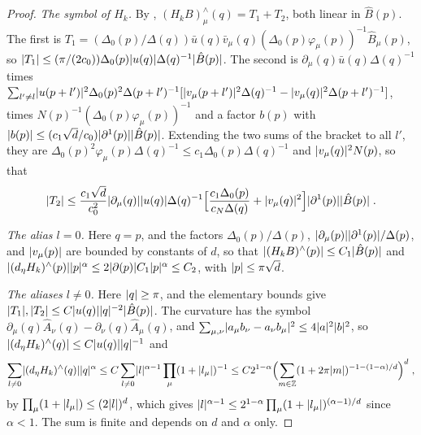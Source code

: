 \documentclass[11pt]{preprint}
\DeclarePairedDelimiter{\abs}{\lvert}{\rvert}
\numberwithin{equation}{section}
\theoremstyle{definition}
\theoremstyle{remark}
\theoremstyle{plain}
\begin{document}
\begin{proof}
\emph{The symbol of $H_k$.} By \cite[(1.63), p.~28]{BalabanPRT1}, $(H_kB)^\wedge_\mu(q) = T_1 + T_2$, both linear in $\hat B(p)$. The first is $T_1 = (\Delta_0(p)/\Delta(q))\bar u(q)\bar v_\mu(q)(\Delta_0(p)\varphi_\mu(p))^{-1}\hat B_\mu(p)$, so $\abs{T_1} \leq (\pi/(2c_0))\Delta_0(p)\abs{u(q)}\Delta(q)^{-1}\abs{\hat B(p)}$. The second is $\partial_\mu(q)\bar u(q)\Delta(q)^{-1}$ times $\sum_{l' \neq l}\abs{u(p + l')}^2\Delta_0(p)^2\Delta(p + l')^{-1}[\abs{v_\mu(p + l')}^2\Delta(q)^{-1} - \abs{v_\mu(q)}^2\Delta(p + l')^{-1}]$, times $N(p)^{-1}(\Delta_0(p)\varphi_\mu(p))^{-1}$ and a factor $b(p)$ with $\abs{b(p)} \leq (c_1\sqrt d/c_0)\abs{\partial^1(p)}\abs{\hat B(p)}$. Extending the two sums of the bracket to all $l'$, they are $\Delta_0(p)^2\varphi_\mu(p)\Delta(q)^{-1} \leq c_1\Delta_0(p)\Delta(q)^{-1}$ and $\abs{v_\mu(q)}^2N(p)$, so that
\begin{equation}\label{eq:t-two-bound}
    \abs{T_2} \leq \frac{c_1\sqrt d}{c_0^2}\abs{\partial_\mu(q)}\abs{u(q)}\Delta(q)^{-1}\Bigl[\frac{c_1\Delta_0(p)}{c_N\Delta(q)} + \abs{v_\mu(q)}^2\Bigr]\abs{\partial^1(p)}\abs{\hat B(p)}\;.
\end{equation}

\emph{The alias $l = 0$.} Here $q = p$, and the factors $\Delta_0(p)/\Delta(p)$, $\abs{\partial_\mu(p)}\abs{\partial^1(p)}/\Delta(p)$, and $\abs{v_\mu(p)}$ are bounded by constants of $d$, so that $\abs{(H_kB)^\wedge(p)} \leq C_1\abs{\hat B(p)}$ and $\abs{(d_\eta H_k)^\wedge(p)}\abs{p}^\alpha \leq 2\abs{\partial(p)}C_1\abs{p}^\alpha \leq C_2$, with $\abs{p} \leq \pi\sqrt d$.

\emph{The aliases $l \neq 0$.} Here $\abs{q} \geq \pi$, and the elementary bounds give $\abs{T_1}, \abs{T_2} \leq C\abs{u(q)}\abs{q}^{-2}\abs{\hat B(p)}$. The curvature has the symbol $\partial_\mu(q)\hat A_\nu(q) - \partial_\nu(q)\hat A_\mu(q)$, and $\sum_{\mu,\nu}\abs{a_\mu b_\nu - a_\nu b_\mu}^2 \leq 4\abs{a}^2\abs{b}^2$, so $\abs{(d_\eta H_k)^\wedge(q)} \leq C\abs{u(q)}\abs{q}^{-1}$ and
\begin{equation}\label{eq:alias-sum}
    \sum_{l \neq 0}\abs{(d_\eta H_k)^\wedge(q)}\abs{q}^\alpha \leq C\sum_{l \neq 0}\abs{l}^{\alpha-1}\prod_\mu(1 + \abs{l_\mu})^{-1} \leq C2^{1-\alpha}\Bigl(\sum_{m \in \mathbb Z}(1 + 2\pi\abs{m})^{-1-(1-\alpha)/d}\Bigr)^d\;,
\end{equation}
by $\prod_\mu(1 + \abs{l_\mu}) \leq (2\abs{l})^d$, which gives $\abs{l}^{\alpha-1} \leq 2^{1-\alpha}\prod_\mu(1 + \abs{l_\mu})^{(\alpha-1)/d}$ since $\alpha < 1$. The sum is finite and depends on $d$ and $\alpha$ only.
\end{proof}
\end{document}
